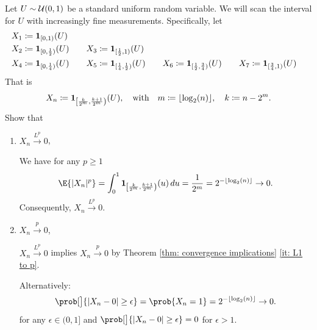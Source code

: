 \begin{exercise} 
    \label{ex: convergence in Lp but not as}
    Let \(U\sim \mathcal{U}(0,1)\) be a standard uniform random variable.
    We will scan the interval for \(U\) with increasingly fine measurements. Specifically,
    let
    \begin{alignat*}{7}
        X_1 &\coloneq \ind{[0,1)}(U)
        \\
        X_2 &\coloneq \ind{[0,\frac12)}(U)
        \quad & X_3 &\coloneq \ind{[\frac12, 1)}(U)
        \\
        X_4 &\coloneq \ind{[0, \frac14)}(U)
        \quad & X_5 &\coloneq \ind{[\frac14, \frac12)}(U)
        \quad & X_6 &\coloneq \ind{[\frac12, \frac34)}(U)
        \quad & X_7 &\coloneq \ind{[\frac34, 1)}(U)
    \end{alignat*}
    That is
    \[
        X_n \coloneq \ind{\left[
            \frac{k}{2^{m}}, \frac{k+1}{2^{m}}
        \right)}(U),
        \quad \text{with}\quad 
        m \coloneq \lfloor\log_2(n)\rfloor, \quad k \coloneq n - 2^m. 
    \]
    Show that
    \begin{enumerate}[label=(\alph*), noitemsep]
        \item \(X_n \xrightarrow{L^p} 0\),
        \begin{solution}
            We have for any \(p \ge 1\)
            \[
                \E{|X_n|^p} = \int_0^1 \ind{
                    \left[\frac{k}{2^{m}}, \frac{k+1}{2^{m}} \right)
                }(u) \, du
                = \frac{1}{2^m} = 2^{-\lfloor \log_2(n) \rfloor} \to 0.
            \]
            Consequently, \(X_n \xrightarrow{L^p} 0\).
        \end{solution}

        \item \(X_n \xrightarrow{p} 0\),
        \begin{solution}
            \(X_n \xrightarrow{L^p} 0\) implies \(X_n \xrightarrow{p} 0\) by Theorem
            \ref{thm: convergence implications} \ref{it: L1 to p}.

            Alternatively:
            \[
                \prob[\bigl]{|X_n - 0| \ge \epsilon}
                = \prob{X_n = 1}
                = 2^{-\lfloor \log_2(n) \rfloor} \to 0.
            \]
            for any \(\epsilon \in (0,1]\) and \(\prob[\bigl]{|X_n - 0| \ge
            \epsilon}=0\) for \(\epsilon > 1\).
        \end{solution}


\end{enumerate}
\end{exercise}

